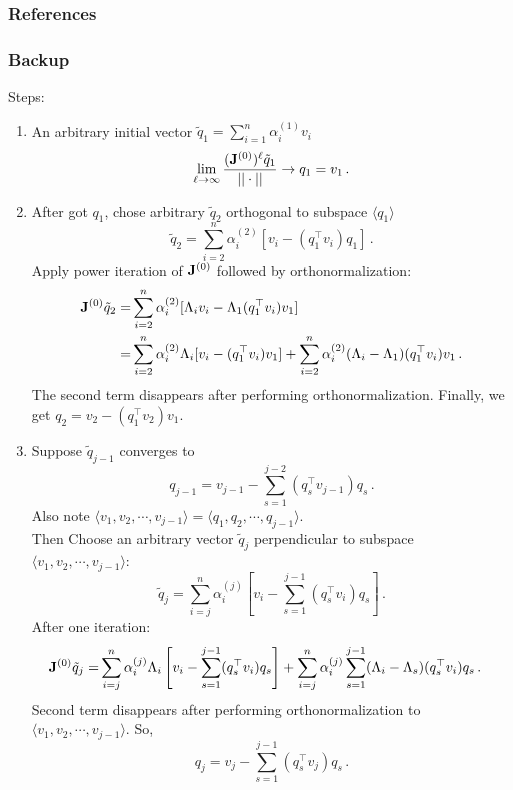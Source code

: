 \documentclass[mathserif, handout]{beamer}
\begin{document}
\begin{frame}[allowframebreaks]
  \frametitle{References}
  \scriptsize{}
  
\end{frame}


\begin{frame}[allowframebreaks]
  \frametitle{Backup}
  Steps:
  \begin{enumerate}
  \item An arbitrary initial vector
    $\tilde{q}_{1}=\sum_{i=1}^{n}\alpha^{(1)}_{i}v_{i}$
    \[
    \lim_{\ell\to \infty }\frac{(\mathbf{J}^{(0)})^{\ell}\tilde{q}_{1}}{||\cdot||}
    \to q_{1}=v_{1}
    \,.
    \]

  \item After got $q_1$, chose arbitrary $\tilde{q}_{2}$ orthogonal to
    subspace $\langle q_{1} \rangle$
    \[
    \tilde{q}_{2}= \sum_{i=2}^{n}\alpha^{(2)}_{i}[v_{i}-(q_{1}^\top
    v_{i})q_{1}]
    \,.
    \]
    Apply power
    iteration of $\mathbf{J}^{(0)}$ followed by orthonormalization:
    \begin{align*}
      \mathbf{J}^{(0)}\tilde{q}_{2}= &\sum_{i=2}^{n}\alpha^{(2)}_{i}
      [\Lambda_{i}v_{i}-\Lambda_{1}(q_{1}^\top v_{i})v_{1}] \\
      = & \sum_{i=2}^{n}\alpha^{(2)}_{i}\Lambda_{i}[v_{i}-
      (q_{1}^\top v_{i})v_{1}]+\sum_{i=2}^{n}\alpha^{(2)}_{i}
      (\Lambda_{i}-\Lambda_{1})(q_{1}^\top v_{i})v_{1}
      \,.
    \end{align*}
    The second term disappears after performing orthonormalization.
    Finally, we get $q_{2}=v_{2}-(q_{1}^\top v_{2})v_{1}$.


  \item Suppose $\tilde{q}_{j-1}$ converges to
    \[
    q_{j-1}=v_{j-1}-\sum_{s=1}^{j-2}(q_{s}^\top v_{j-1})q_{s}
    \,.
    \]
    Also note $\langle v_{1},v_{2},\cdots,v_{j-1}\rangle=\langle
    q_{1},q_{2},\cdots,q_{j-1}\rangle$. \\
    Then Choose an arbitrary vector
    $\tilde{q}_{j}$ perpendicular to subspace $\langle
    v_{1},v_{2},\cdots,v_{j-1}\rangle$:
    \[
    \tilde{q}_{j}=\sum_{i=j}^{n}\alpha_{i}^{(j)}[v_{i}-\sum_{s=1}^{j-1}
    (q^\top _{s}v_{i})q_{s}]
    \,.
    \]
    After one iteration:
    \begin{align*}
      \mathbf{J}^{(0)}\tilde{q}_{j}
      = & \sum_{i=j}^{n}\alpha^{(j)}_{i}\Lambda_{i}
      \left[v_{i}-\sum_{s=1}^{j-1}(q_{s}^\top v_{i})q_{s}\right]
      +
      \sum_{i=j}^{n}\alpha^{(j)}_{i}\sum_{s=1}^{j-1}
      (\Lambda_{i}-\Lambda_{s})(q_{s}^\top v_{i})q_{s}
      \,.
    \end{align*}
    Second term disappears after performing orthonormalization to
    $\langle  v_{1},v_{2},\cdots,v_{j-1}\rangle$.
    So,
    \[
    q_{j}=v_{j}-\sum_{s=1}^{j-1}(q_{s}^\top v_{j})q_{s}
    \,.
    \]
  \end{enumerate}


\end{frame}
\end{document}
